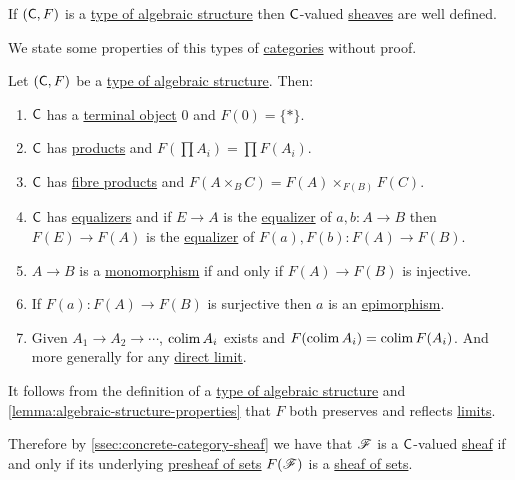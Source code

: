 \documentclass[../../../main]{subfiles}
\begin{document}
\begin{remark}
  If \((\mathsf{C}, F)\) is a \hyperref[def:algebraic-structure]{type of algebraic structure} then \(\mathsf{C}\)-valued \hyperref[def:sheaf]{sheaves} are well defined.
\end{remark}

We state some properties of this types of \hyperref[def:category]{categories} without proof.
\begin{lemma} \label{lemma:algebraic-structure-properties}
  Let \((\mathsf{C}, F)\) be a \hyperref[def:algebraic-structure]{type of algebraic structure}. Then:
  \begin{enumerate}
    \item \(\mathsf{C}\) has a \hyperref[def:initial-terminal-object]{terminal object} \(0\) and \(F(0) = \{\ast\}\).
    \item \(\mathsf{C}\) has \hyperref[def:categorical-product]{products} and \(F \left( \prod A_{i} \right) = \prod F \left( A_{i} \right)\).
    \item \(\mathsf{C}\) has \hyperref[def:fibre-product]{fibre products} and \(F(A \times_{B} C) = F(A) \times_{F(B)} F(C)\).
    \item \(\mathsf{C}\) has \hyperref[def:equaliser]{equalizers} and if \(E \to A\) is the \hyperref[def:equaliser]{equalizer} of \(a, b: A \to B\) then \(F(E) \to F(A)\) is the \hyperref[def:equaliser]{equalizer} of \(F(a), F(b): F(A) \to F(B)\).
    \item \(A \to B\) is a \hyperref[def:mono-epi-morphism]{monomorphism} if and only if \(F(A) \to F(B)\) is injective.
    \item If \(F(a): F(A) \to F(B)\) is surjective then \(a\) is an \hyperref[def:mono-epi-morphism]{epimorphism}.
    \item Given \(A_{1} \to A_{2} \to \cdots\), \(\operatorname*{colim} A_{i}\) exists and \(F(\operatorname*{colim} A_{i}) = \operatorname*{colim} F(A_{i})\). And more generally for any \hyperref[def:direct-limit]{direct limit}.
  \end{enumerate}
\end{lemma}

\begin{remark}
  It follows from the definition of a \hyperref[def:algebraic-structure]{type of algebraic structure} and \autoref{lemma:algebraic-structure-properties} that \(F\) both preserves and reflects \hyperref[def:categorical-limit]{limits}.

  Therefore by \autoref{ssec:concrete-category-sheaf} we have that \(\mathscr{F}\) is a \(\mathsf{C}\)-valued \hyperref[def:sheaf]{sheaf} if and only if its underlying \hyperref[def:presheaf]{presheaf of sets} \(F(\mathscr{F})\) is a \hyperref[def:set-valued-sheaf]{sheaf of sets}.
\end{remark}
\end{document}
